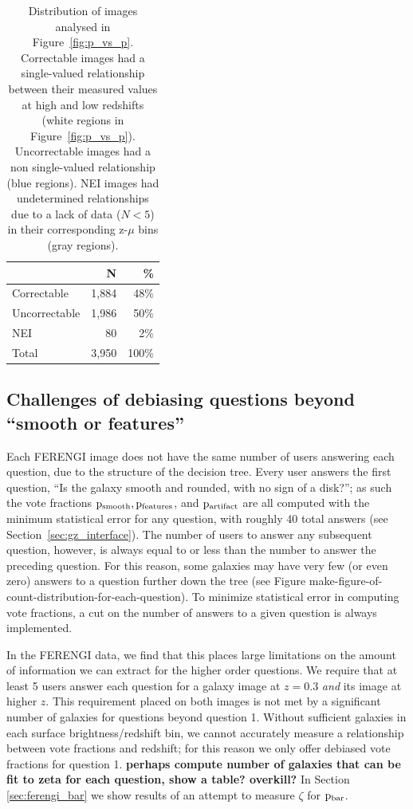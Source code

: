 \documentclass[usenatbib]{mn2e}
\begin{document}
\begin{table}
\caption{Distribution of \ferengi{} images analysed in Figure~\ref{fig:p_vs_p}. Correctable images had a single-valued relationship between their measured \pfeatures{} values at high and low redshifts (white regions in Figure~\ref{fig:p_vs_p}). Uncorrectable images had a non single-valued relationship (blue regions). NEI images had undetermined relationships due to a lack of data ($N<5$) in their corresponding z-$\mu$ bins (gray regions).\label{tbl:ferengi_corrections}}
\begin{tabular}{lrr}
\hline \hline
				                   & N       & \% \\
\hline 
Correctable                        & 1,884   & 48\% \\
Uncorrectable                      & 1,986   & 50\% \\
NEI                                & 80     &  2\%\\
Total                              & 3,950   & 100\% \\
\hline \hline
\end{tabular}
\end{table}

\subsection{Challenges of debiasing questions beyond ``smooth or features''}
Each FERENGI image does not have the same number of users answering each question, due to the structure of the decision tree. Every user answers the first question, ``Is the galaxy smooth and rounded, with no sign of a disk?''; as such the vote fractions $\rm p_{smooth}, p_{features}$, and $\rm p_{artifact}$ are all computed with the minimum statistical error for any question, with roughly 40 total answers (see Section~\ref{sec:gz_interface}). The number of users to answer any subsequent question, however, is always equal to or less than the number to answer the preceding question. For this reason, some galaxies may have very few (or even zero) answers to a question further down the tree (see Figure make-figure-of-count-distribution-for-each-question). To minimize statistical error in computing vote fractions, a cut on the number of answers to a given question is always implemented. 

In the FERENGI data, we find that this places large limitations on the amount of information we can extract for the higher order questions. We require that at least 5 users answer each question for a galaxy image at $z=0.3$ \emph{and} its image at higher $z$. This requirement placed on both images is not met by a significant number of galaxies for questions beyond question 1. Without sufficient galaxies in each surface brightness/redshift bin, we cannot accurately measure a relationship between vote fractions and redshift; for this reason we only offer debiased vote fractions for question 1. \textbf{perhaps compute number of galaxies that can be fit to zeta for each question, show a table? overkill?} In Section \ref{sec:ferengi_bar} we show results of an attempt to measure $\zeta$ for $\rm p_{bar}$. 
\end{document}

